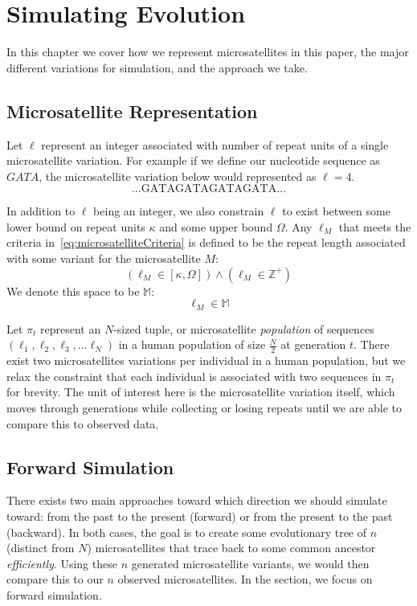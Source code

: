 \chapter{Simulating Evolution}\label{ch:simulatingEvolution}
In this chapter we cover how we represent microsatellites in this paper, the major different variations for simulation,
and the approach we take.

\section{Microsatellite Representation}\label{sec:microsatelliteRepresentation}
Let $\ell$ represent an integer associated with number of repeat units of a single microsatellite variation.
For example if we define our nucleotide sequence as $GATA$, the microsatellite variation below would represented
as $\ell=4$.
\begin{equation*}
    \ldots \text{GATAGATAGATAGATA} \ldots
\end{equation*}

In addition to $\ell$ being an integer, we also constrain $\ell$ to exist between some lower bound on repeat units
$\kappa$ and some upper bound $\Omega$.
Any $\ell_M$ that meets the criteria in~\autoref{eq:microsatelliteCriteria} is defined to be the repeat length
associated with some variant for the microsatellite $M$:
\begin{equation}\label{eq:microsatelliteCriteria}
    \left(\ell_M \in [\kappa, \Omega]\right) \land \left(\ell_M \in \mathbb{Z}^+\right)
\end{equation}
We denote this space to be $\mathbb{M}$:
\begin{equation}
    \ell_M \in \mathbb{M}
\end{equation}

Let $\pi_t$ represent an $N$-sized tuple, or microsatellite \emph{population} of sequences
$\left(\ell_1, \ell_2, \ell_3, \ldots \ell_{N}\right)$ in a human population of size $\frac{N}{2}$ at generation $t$.
There exist two microsatellites variations per individual in a human population, but we relax the constraint that
each individual is associated with two sequences in $\pi_t$ for brevity.
The unit of interest here is the microsatellite variation itself, which moves through generations while collecting or
losing repeats until we are able to compare this to observed data.

\section{Forward Simulation}\label{sec:forwardSimulation}
There exists two main approaches toward which direction we should simulate toward: from the past to the present
(forward) or from the present to the past (backward).
In both cases, the goal is to create some evolutionary tree of $n$ (distinct from $N$) microsatellites that trace back
to some common ancestor \emph{efficiently}.
Using these $n$ generated microsatellite variants, we would then compare this to our $n$ observed microsatellites.
In the section, we focus on forward simulation.

